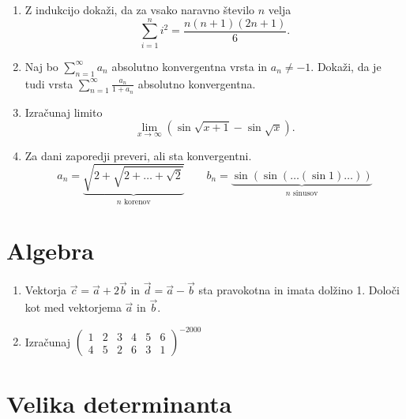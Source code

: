 \documentclass[a4paper,12pt]{article}
\begin{document}
\begin{enumerate}
\item
Z indukcijo dokaži, da za vsako naravno število \(n\) velja
\[\sum_{i=1}^{n} i^2=\frac{n(n+1)(2n+1)}{6}.\]

\item
Naj bo \(\sum_{n=1}^{\infty} a_n\) absolutno konvergentna vrsta in \(a_n \ne -1\).
Dokaži, da je tudi vrsta \(\sum_{n=1}^\infty \frac{a_n}{1+a_n}\)
absolutno konvergentna.

\item
Izračunaj limito
\[\lim_{x\to\infty}(\sin\sqrt{x+1}-\sin\sqrt{x}).\]

\item
Za dani zaporedji preveri, ali sta konvergentni.
\[a_n=\underbrace{\sqrt{2+\sqrt{2+\dots+\sqrt{2}}}}_{n\text{~korenov}}\qquad b_n=\underbrace{\sin(\sin(\dots(\sin 1)\dots))}_{n\text{~sinusov}}\]
\end{enumerate}

\section*{Algebra}

\begin{enumerate}
\item
Vektorja \(\vec{c}=\vec{a}+2\vec{b}\) in \(\vec{d}=\vec{a}-\vec{b}\)
sta pravokotna in imata dolžino 1. Določi kot med vektorjema \(\vec{a}\) in \(\vec{b}\).

\item
Izračunaj
\(\begin{pmatrix}1&2&3&4&5&6\\4&5&2&6&3&1\end{pmatrix}^{-2000}\)
\end{enumerate}

\section*{Velika determinanta}
\end{document}
